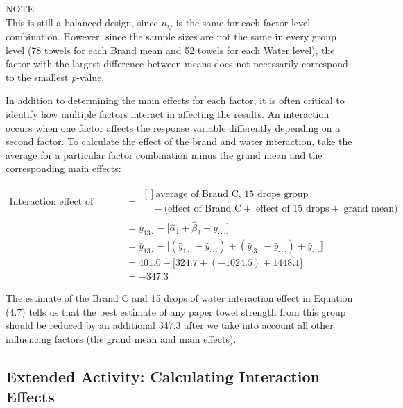 \documentclass[
]{report}
\begin{document}
NOTE\\
This is still a balanced design, since \(n_{ij}\) is the same for each factor-level combination. However, since the sample sizes are not the same in every group level (78 towels for each Brand mean and 52 towels for each Water level), the factor with the largest difference between means does not necessarily correspond to the smallest \emph{p}-value.

In addition to determining the main effects for each factor, it is often critical to identify how multiple factors interact in affecting the results. An interaction occurs when one factor affects the response variable differently depending on a second factor. To calculate the effect of the brand and water interaction, take the average for a particular factor combination minus the grand mean and the corresponding main effects:

\begin{align}
\text{Interaction effect of Brand C and 15 drops of water}
  &= 
    \begin{aligned}[]
      \text{average of Brand C, 15 drops group}\\
      \quad
      -\bigl(\text{effect of Brand C}
             +\;\text{effect of 15 drops}
             +\;\text{grand mean}\bigr)
    \end{aligned}
    \nonumber
\\[6pt]
&= \bar y_{13\cdot} - \bigl[\hat\alpha_1 + \hat\beta_3 + \bar y_{\cdot\cdot\cdot}\bigr]
    \nonumber
\\[6pt]
&= \bar y_{13\cdot}
  - \bigl[(\bar y_{1\cdot\cdot}-\bar y_{\cdot\cdot\cdot})
         +(\bar y_{\cdot3\cdot}-\bar y_{\cdot\cdot\cdot})
         +\bar y_{\cdot\cdot\cdot}\bigr]
    \nonumber
\\[6pt]
&= 401.0 - \bigl[324.7 + (-1024.5) + 1448.1\bigr]
    \nonumber
\\[6pt]
&= -347.3
\tag{4.7}
\end{align}

The estimate of the Brand C and 15 drops of water interaction effect in Equation (4.7) tells us that the best
estimate of any paper towel strength from this group should be reduced by an additional 347.3 after we take
into account all other influencing factors (the grand mean and main effects).

\subsection{Extended Activity: Calculating Interaction Effects}\label{extended-activity-calculating-interaction-effects}
\end{document}
